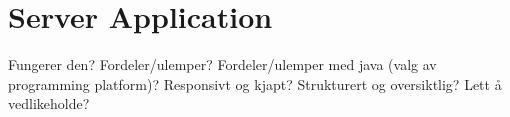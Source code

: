\section{Server Application}
Fungerer den? Fordeler/ulemper? Fordeler/ulemper med java (valg av programming platform)? Responsivt og kjapt? Strukturert og oversiktlig? Lett å vedlikeholde?